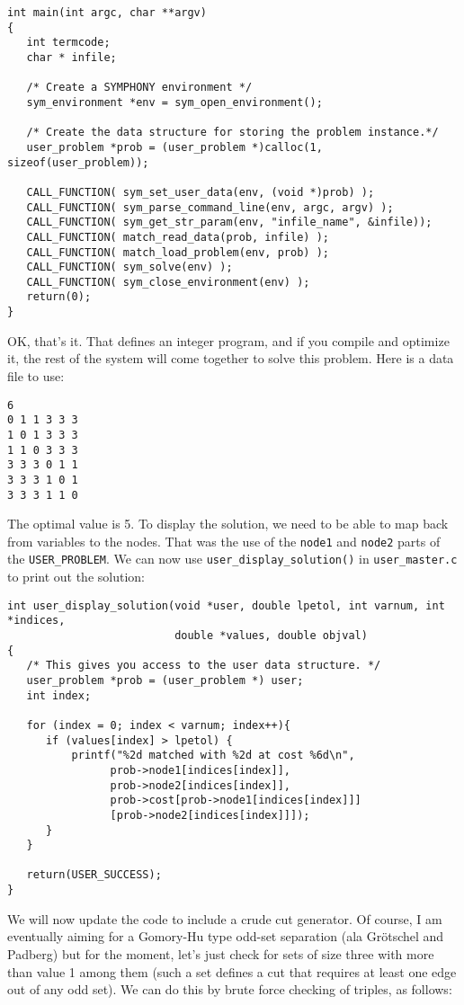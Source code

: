 \documentclass[11pt]{article}
\begin{document}
\begin{verbatim}
int main(int argc, char **argv)
{
   int termcode;
   char * infile;

   /* Create a SYMPHONY environment */
   sym_environment *env = sym_open_environment();

   /* Create the data structure for storing the problem instance.*/
   user_problem *prob = (user_problem *)calloc(1, sizeof(user_problem));
   
   CALL_FUNCTION( sym_set_user_data(env, (void *)prob) );
   CALL_FUNCTION( sym_parse_command_line(env, argc, argv) );
   CALL_FUNCTION( sym_get_str_param(env, "infile_name", &infile));
   CALL_FUNCTION( match_read_data(prob, infile) );
   CALL_FUNCTION( match_load_problem(env, prob) );
   CALL_FUNCTION( sym_solve(env) );
   CALL_FUNCTION( sym_close_environment(env) );
   return(0);
}
\end{verbatim}

OK, that's it. That defines an integer program, and if you compile and
optimize it, the rest of the system will come together to solve this problem.
Here is a data file to use:
\begin{verbatim}
6
0 1 1 3 3 3
1 0 1 3 3 3
1 1 0 3 3 3
3 3 3 0 1 1
3 3 3 1 0 1
3 3 3 1 1 0
\end{verbatim}

The optimal value is 5. To display the solution, we need to be able to map
back from variables to the nodes. That was the use of the \texttt{node1} and
\texttt{node2} parts of the \texttt{USER\_PROBLEM}. We can now use
\texttt{user\_display\_solution()} in \texttt{user\_master.c} to print 
out the solution:

\begin{verbatim}
int user_display_solution(void *user, double lpetol, int varnum, int *indices,
                          double *values, double objval)
{
   /* This gives you access to the user data structure. */
   user_problem *prob = (user_problem *) user;
   int index;
 
   for (index = 0; index < varnum; index++){
      if (values[index] > lpetol) {
          printf("%2d matched with %2d at cost %6d\n",
                prob->node1[indices[index]],
                prob->node2[indices[index]],
                prob->cost[prob->node1[indices[index]]]
                [prob->node2[indices[index]]]);
      }	   
   }
   
   return(USER_SUCCESS);
}
\end{verbatim}

We will now update the code to include a crude cut generator. Of course, I am
eventually aiming for a Gomory-Hu type odd-set separation (ala Gr\"otschel and
Padberg) but for the moment, let's just check for sets of size three with more
than value 1 among them (such a set defines a cut that requires at least one
edge out of any odd set). We can do this by brute force checking of triples,
as follows: 
\end{document}
